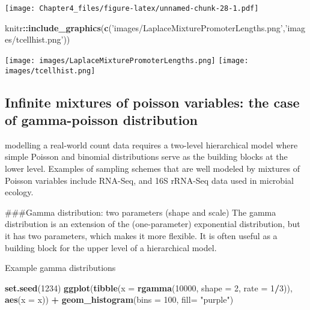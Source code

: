 \documentclass[]{article}
\newenvironment{Shaded}{\begin{snugshade}}{\end{snugshade}}
\newcommand{\DataTypeTok}[1]{\textcolor[rgb]{0.13,0.29,0.53}{#1}}
\newcommand{\DecValTok}[1]{\textcolor[rgb]{0.00,0.00,0.81}{#1}}
\newcommand{\KeywordTok}[1]{\textcolor[rgb]{0.13,0.29,0.53}{\textbf{#1}}}
\newcommand{\NormalTok}[1]{#1}
\newcommand{\OperatorTok}[1]{\textcolor[rgb]{0.81,0.36,0.00}{\textbf{#1}}}
\newcommand{\StringTok}[1]{\textcolor[rgb]{0.31,0.60,0.02}{#1}}
\begin{document}
\texttt{[image: Chapter4\_files/figure-latex/unnamed-chunk-28-1.pdf]}

\begin{Shaded}
\begin{Highlighting}[]
\NormalTok{knitr}\OperatorTok{::}\KeywordTok{include_graphics}\NormalTok{(}\KeywordTok{c}\NormalTok{(}\StringTok{'images/LaplaceMixturePromoterLengths.png'}\NormalTok{,}\StringTok{'images/tcellhist.png'}\NormalTok{))}
\end{Highlighting}
\end{Shaded}

\texttt{[image: images/LaplaceMixturePromoterLengths.png]}
\texttt{[image: images/tcellhist.png]}

\hypertarget{infinite-mixtures-of-poisson-variables-the-case-of-gamma-poisson-distribution}{%
\subsection{Infinite mixtures of poisson variables: the case of
gamma-poisson
distribution}\label{infinite-mixtures-of-poisson-variables-the-case-of-gamma-poisson-distribution}}

modelling a real-world count data requires a two-level hierarchical
model where simple Poisson and binomial distributions serve as the
building blocks at the lower level. Examples of sampling schemes that
are well modeled by mixtures of Poisson variables include RNA-Seq, and
16S rRNA-Seq data used in microbial ecology.

\#\#\#Gamma distribution: two parameters (shape and scale) The gamma
distribution is an extension of the (one-parameter) exponential
distribution, but it has two parameters, which makes it more flexible.
It is often useful as a building block for the upper level of a
hierarchical model.

Example gamma distributions

\begin{Shaded}
\begin{Highlighting}[]
\KeywordTok{set.seed}\NormalTok{(}\DecValTok{1234}\NormalTok{)}
\KeywordTok{ggplot}\NormalTok{(}\KeywordTok{tibble}\NormalTok{(}\DataTypeTok{x =} \KeywordTok{rgamma}\NormalTok{(}\DecValTok{10000}\NormalTok{, }\DataTypeTok{shape =} \DecValTok{2}\NormalTok{, }\DataTypeTok{rate =} \DecValTok{1}\OperatorTok{/}\DecValTok{3}\NormalTok{)),}
   \KeywordTok{aes}\NormalTok{(}\DataTypeTok{x =}\NormalTok{ x)) }\OperatorTok{+}\StringTok{ }\KeywordTok{geom_histogram}\NormalTok{(}\DataTypeTok{bins =} \DecValTok{100}\NormalTok{, }\DataTypeTok{fill=} \StringTok{"purple"}\NormalTok{)}
\end{Highlighting}
\end{Shaded}
\end{document}
